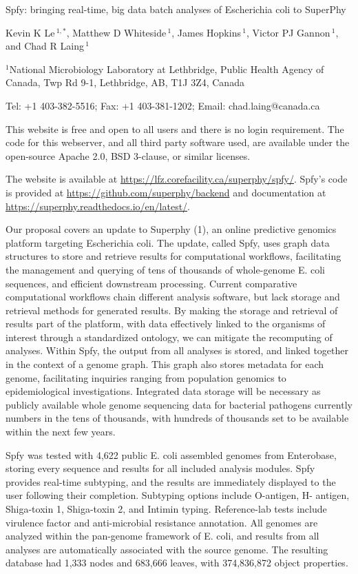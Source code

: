 \documentclass{article}
\begin{document}
Spfy: bringing real-time, big data batch analyses of Escherichia coli to SuperPhy

Kevin K Le\,$^{1, *}$,
Matthew D Whiteside\,$^{1}$,
James Hopkins\,$^{1}$,
Victor PJ Gannon\,$^{1}$,
and Chad R Laing\,$^{1}$

$^{1}$National Microbiology Laboratory at Lethbridge, Public Health Agency of Canada, Twp Rd 9-1, Lethbridge, AB, T1J 3Z4, Canada

Tel: +1 403-382-5516; Fax: +1 403-381-1202; Email: chad.laing@canada.ca

This website is free and open to all users and there is no login requirement. The code for this webserver, and all third party software used, are available under the open-source Apache 2.0, BSD 3-clause, or similar licenses.

The website is available at \url{https://lfz.corefacility.ca/superphy/spfy/}. Spfy’s code is provided at \url{https://github.com/superphy/backend} and documentation at \url{https://superphy.readthedocs.io/en/latest/}.

Our proposal covers an update to Superphy (1), an online predictive genomics platform targeting Escherichia coli. The update, called Spfy, uses graph data structures to store and retrieve results for computational workflows, facilitating the management and querying of tens of thousands of whole-genome E. coli sequences, and efficient downstream processing. Current comparative computational workflows chain different analysis software, but lack storage and retrieval methods for generated results. By making the storage and retrieval of results part of the platform, with data effectively linked to the organisms of interest through a standardized ontology, we can mitigate the recomputing of analyses. Within Spfy, the output from all analyses is stored, and linked together in the context of a genome graph. This graph also stores metadata for each genome, facilitating inquiries ranging from population genomics to epidemiological investigations. Integrated data storage will be necessary as publicly available whole genome sequencing data for bacterial pathogens currently numbers in the tens of thousands, with hundreds of thousands set to be available within the next few years.

Spfy was tested with 4,622 public E. coli assembled genomes from Enterobase, storing every sequence and results for all included analysis modules. Spfy provides real-time subtyping, and the results are immediately displayed to the user following their completion. Subtyping options include O-antigen, H- antigen, Shiga-toxin 1, Shiga-toxin 2, and Intimin typing. Reference-lab tests include virulence factor and anti-microbial resistance annotation. All genomes are analyzed within the pan-genome framework of E. coli, and results from all analyses are automatically associated with the source genome. The resulting database had 1,333 nodes and 683,666 leaves, with 374,836,872 object properties.
\end{document}
